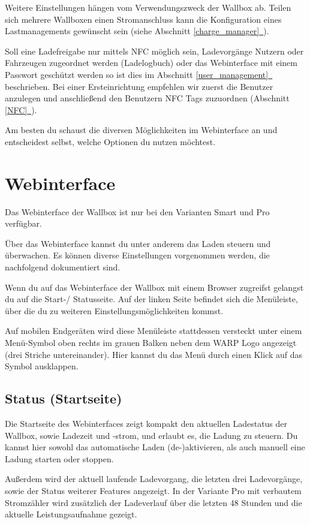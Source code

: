 \documentclass[a4paper,10pt]{article}
\newcommand*{\fullref}[1]{\hyperref[{#1}]{\ref*{#1}~\nameref*{#1}}}
\begin{document}
\begin{multicols*}{2}
	Weitere Einstellungen hängen vom Verwendungszweck der Wallbox ab. Teilen
	sich mehrere Wallboxen einen Stromanschluss kann die Konfiguration eines
	Lastmanagements gewünscht sein (siehe Abschnitt \fullref{charge_manager}).

	Soll eine Ladefreigabe
	nur mittels NFC möglich sein, Ladevorgänge Nutzern oder Fahrzeugen
	zugeordnet werden (Ladelogbuch) oder das Webinterface mit einem Passwort
	geschützt werden so ist dies im Abschnitt \fullref{user_management} beschrieben.
	Bei einer Ersteinrichtung empfehlen wir zuerst die Benutzer anzulegen und
	anschließend den Benutzern NFC Tags zuzuordnen (Abschnitt \fullref{NFC}).

	Am besten du schaust die diversen Möglichkeiten im Webinterface an und
	entscheidest selbst, welche Optionen du nutzen möchtest.

	\section{Webinterface}\label{webinterface}
	Das Webinterface der Wallbox ist nur bei den Varianten Smart und Pro verfügbar.

	Über das Webinterface kannst du unter anderem das Laden steuern und überwachen.
	Es können diverse Einstellungen vorgenommen werden, die nachfolgend
	dokumentiert sind.

	Wenn du auf das Webinterface der Wallbox mit einem Browser zugreifst
	gelangst du auf die Start-/ Statusseite. Auf der linken Seite befindet sich
	die Menüleiste, über die du zu weiteren Einstellungsmöglichkeiten kommst.

	Auf mobilen Endgeräten wird
	diese Menüleiste stattdessen versteckt unter einem Menü-Symbol oben rechts
	im grauen Balken neben dem WARP Logo angezeigt (\glqq drei Striche untereinander\grqq).
	Hier kannst du das Menü durch einen Klick auf das Symbol ausklappen.

	\vspace{-0.2cm}
	\subsection{Status (Startseite)}
	Die Startseite des Webinterfaces zeigt kompakt den aktuellen Ladestatus der
	Wallbox, sowie Ladezeit und -strom, und erlaubt es, die Ladung zu steuern.
	Du kannst hier sowohl das automatische Laden (de-)aktivieren, als auch
	manuell eine Ladung starten oder stoppen.

	Außerdem wird der aktuell laufende Ladevorgang, die letzten drei
	Ladevorgänge, sowie der Status weiterer Features angezeigt.
	In der Variante Pro mit verbautem Stromzähler wird zusätzlich der Ladeverlauf
	über die letzten 48 Stunden und die aktuelle Leistungsaufnahme gezeigt.


\end{multicols*}
\end{document}

